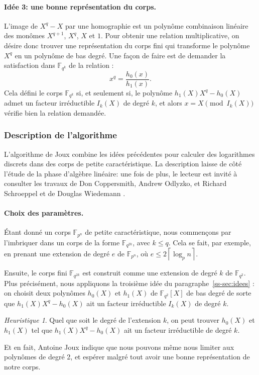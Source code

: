 \documentclass[a4paper, titlepage, 11pt]{article}
\theoremstyle{definition}
\theoremstyle{remark}
\newtheorem{heur}[theo]{Heuristique}
\def\gf #1{\mathbb{F}_{#1}}
\def\ceil #1{\left\lceil#1\right\rceil}
\begin{document}
\paragraph{Idée 3: une bonne représentation du corps.} L'image de $X^q-X$ par une homographie est un polynôme combinaison linéaire des monômes $X^{q+1}$, $X^q$, $X$ et $1$. Pour obtenir une relation multiplicative, on désire donc trouver une représentation du corps fini qui transforme le polynôme $X^q$ en un polynôme de bas degré. Une façon de faire est de demander la satisfaction dans $\gf{q^k}$ de la relation :
$$x^q = \frac{h_0(x)}{h_1(x)}.$$
Cela défini le corps $\gf{q^k}$ si, et seulement si, le polynôme $h_1(X)X^q - h_0(X)$ admet un facteur irréductible $I_k(X)$ de degré $k$, et alors $x = X \pmod{I_k(X)}$ vérifie bien la relation demandée.

\subsubsection{Description de l'algorithme}

L'algorithme de Joux combine les idées précédentes pour calculer des logarithmes discrets dans des corps de petite caractéristique. La description laisse de côté l'étude de la phase d'algèbre linéaire: une fois de plus, le lecteur est invité à consulter les travaux de Don Coppersmith, Andrew Odlyzko, et Richard Schroeppel \cite{coppersmith1986} et de Douglas Wiedemann \cite{wiedemann1986}.

\paragraph{Choix des paramètres.}Étant donné un corps $\gf{p^n}$ de petite caractéristique, nous commençons par l'imbriquer dans un corps de la forme $\gf{q^{2k}}$, avec $k \leqslant q$. Cela se fait, par exemple, en prenant une extension de degré $e$ de $\gf{p^n}$, où $e \leqslant 2 \ceil{\log_p n}$.

Ensuite, le corps fini $\gf{q^{2k}}$ est construit comme une extension de degré $k$ de $\gf{q^2}$. Plus précisément, nous appliquons la troisième idée du paragraphe~\ref{ss-sec:idees} : on choisit deux polynômes $h_0(X)$ et $h_1(X)$ de $\gf{q^2}[X]$ de bas degré de sorte que $h_1(X)X^q - h_0(X)$ ait un facteur irréductible $I_k(X)$ de degré $k$.
\begin{heur}
Quel que soit le degré de l'extension $k$, on peut trouver $h_0(X)$ et $h_1(X)$  tel que $h_1(X)X^q - h_0(X)$ ait un facteur irréductible de degré $k$.
\end{heur}
Et en fait, Antoine Joux \cite{joux2013} indique que nous pouvons même nous limiter aux polynômes de degré 2, et espérer malgré tout avoir une bonne représentation de notre corps.
\end{document}
